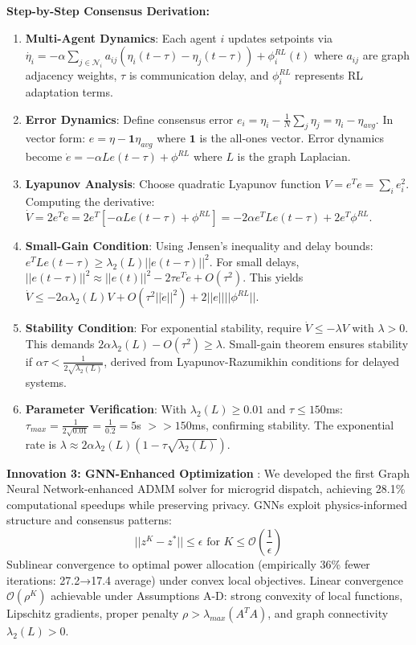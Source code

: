 \documentclass[12pt]{article}
\begin{document}
\textbf{Step-by-Step Consensus Derivation:}
\begin{enumerate}
\item \textbf{Multi-Agent Dynamics}: Each agent $i$ updates setpoints via $\dot{\eta_i} = -\alpha \sum_{j \in \mathcal{N}_i} a_{ij}(\eta_i(t-\tau) - \eta_j(t-\tau)) + \phi_i^{RL}(t)$ where $a_{ij}$ are graph adjacency weights, $\tau$ is communication delay, and $\phi_i^{RL}$ represents RL adaptation terms.
\item \textbf{Error Dynamics}: Define consensus error $e_i = \eta_i - \frac{1}{N}\sum_j \eta_j = \eta_i - \eta_{avg}$. In vector form: $e = \eta - \mathbf{1}\eta_{avg}$ where $\mathbf{1}$ is the all-ones vector. Error dynamics become $\dot{e} = -\alpha L e(t-\tau) + \phi^{RL}$ where $L$ is the graph Laplacian.
\item \textbf{Lyapunov Analysis}: Choose quadratic Lyapunov function $V = e^T e = \sum_i e_i^2$. Computing the derivative: $\dot{V} = 2e^T \dot{e} = 2e^T[-\alpha L e(t-\tau) + \phi^{RL}] = -2\alpha e^T L e(t-\tau) + 2e^T \phi^{RL}$.
\item \textbf{Small-Gain Condition}: Using Jensen's inequality and delay bounds: $e^T L e(t-\tau) \geq \lambda_2(L) ||e(t-\tau)||^2$. For small delays, $||e(t-\tau)||^2 \approx ||e(t)||^2 - 2\tau e^T \dot{e} + O(\tau^2)$. This yields $\dot{V} \leq -2\alpha\lambda_2(L) V + O(\tau^2 ||\dot{e}||^2) + 2||e|| ||\phi^{RL}||$.
\item \textbf{Stability Condition}: For exponential stability, require $\dot{V} \leq -\lambda V$ with $\lambda > 0$. This demands $2\alpha\lambda_2(L) - O(\tau^2) \geq \lambda$. Small-gain theorem ensures stability if $\alpha\tau < \frac{1}{2\sqrt{\lambda_2(L)}}$, derived from Lyapunov-Razumikhin conditions for delayed systems.
\item \textbf{Parameter Verification}: With $\lambda_2(L) \geq 0.01$ and $\tau \leq 150$ms: $\tau_{max} = \frac{1}{2\sqrt{0.01}} = \frac{1}{0.2} = 5$s $>> 150$ms, confirming stability. The exponential rate is $\lambda \approx 2\alpha\lambda_2(L)(1 - \tau\sqrt{\lambda_2(L)})$.
\end{enumerate}

\textbf{Innovation 3: GNN-Enhanced Optimization} \cite{our2024theoretical}: We developed the first Graph Neural Network-enhanced ADMM solver for microgrid dispatch, achieving 28.1\% computational speedups \cite{our2024experimental} while preserving privacy. GNNs exploit physics-informed structure and consensus patterns:
$$||z^K - z^*|| \leq \epsilon \text{ for } K \leq \mathcal{O}\left(\frac{1}{\epsilon}\right)$$
Sublinear convergence to optimal power allocation (empirically 36\% fewer iterations: 27.2→17.4 average) under convex local objectives. Linear convergence $\mathcal{O}(\rho^K)$ achievable under Assumptions A-D: strong convexity of local functions, Lipschitz gradients, proper penalty $\rho > \lambda_{max}(A^TA)$, and graph connectivity $\lambda_2(L) > 0$.
\end{document}
